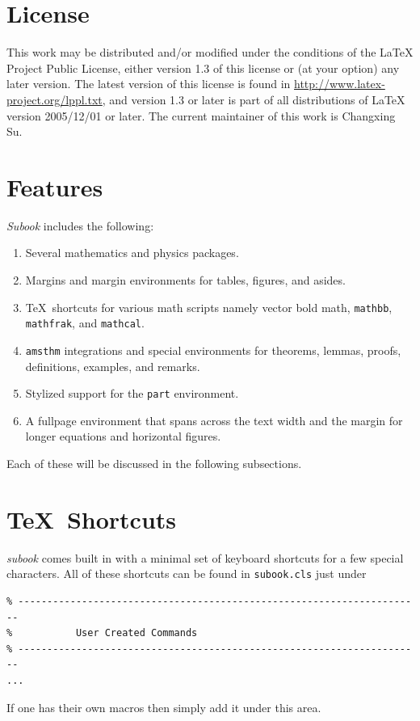 \documentclass[]{subook}
\begin{document}
\section{License}\label{sec:license}
This work may be distributed and/or modified under the conditions of the LaTeX Project Public License, 
either version 1.3 of this license or (at your option) any later version. 
The latest version of this license is found in  \url{http://www.latex-project.org/lppl.txt}, 
and version 1.3 or later is part of all distributions of LaTeX version 2005/12/01 or later. 
The current maintainer of this work is Changxing Su.

\section{Features}\label{sec:Features}

\textit{Subook} includes the following:
	\begin{enumerate}
		\item Several mathematics and physics packages.
		\item Margins and margin environments for tables, figures, and asides.
		\item \TeX\ shortcuts for various math scripts namely vector bold math, \texttt{mathbb}, \texttt{mathfrak}, and \texttt{mathcal}.
		\item \texttt{amsthm} integrations and special environments for theorems, lemmas, proofs, definitions, examples, and remarks.\
		\item Stylized support for the \texttt{part} environment.
		\item A fullpage environment that spans across the text width and the margin for longer equations and horizontal figures.
	\end{enumerate}
    Each of these will be discussed in the following subsections.


\section{\TeX\ Shortcuts}\label{sec:shortcuts}
\textit{subook} comes built in with a minimal set of keyboard shortcuts for a few special characters. All of these shortcuts can be found in \texttt{subook.cls} just under
\begin{verbatim}
% ----------------------------------------------------------------------
%           User Created Commands
% ----------------------------------------------------------------------
...
\end{verbatim}
If one has their own macros then simply add it under this area. 
\end{document}
